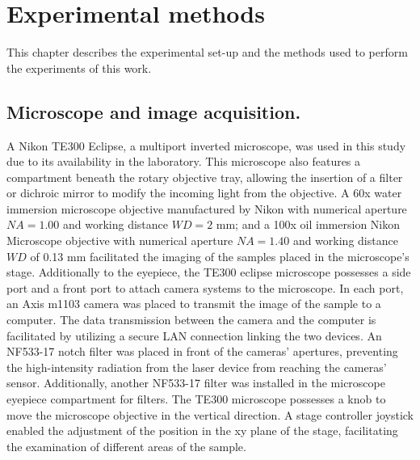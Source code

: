 \documentclass[letterpaper,12pt,oneside]{book}
\begin{document}
 
\chapter{Experimental methods}
This chapter describes the experimental set-up and the methods used to perform the experiments of this work. 
\section{Microscope and image acquisition.}
A Nikon TE300 Eclipse, a multiport inverted microscope, was used in this study due to its availability in the laboratory. This microscope also features a compartment beneath the rotary objective tray, allowing the insertion of a filter or dichroic mirror to modify the incoming light from the objective. A 60x water immersion microscope objective manufactured by Nikon with numerical aperture $NA=1.00$ and working distance $WD=2$ mm; and a 100x oil immersion Nikon Microscope objective with numerical aperture $NA=1.40$ and working distance $WD$ of 0.13 mm facilitated the imaging of the samples placed in the microscope's stage. Additionally to the eyepiece, the TE300 eclipse microscope possesses a side port and a front port to attach camera systems to the microscope. In each port, an Axis m1103 camera was placed to transmit the image of the sample to a computer. The data transmission between the camera and the computer is facilitated by utilizing a secure LAN connection linking the two devices. An NF533-17 notch filter was placed in front of the cameras' apertures, preventing the high-intensity radiation from the laser device from reaching the cameras' sensor. Additionally, another NF533-17 filter was installed in the microscope eyepiece compartment for filters. The TE300 microscope possesses a knob to move the microscope objective in the vertical direction. 
A stage controller joystick enabled the adjustment of the position in the xy plane of the stage, facilitating the examination of different areas of the sample.
\newpage
\end{document}
